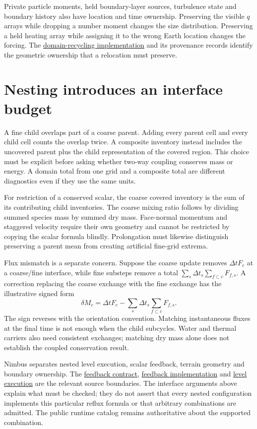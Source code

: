 Private particle moments, held boundary-layer sources, turbulence state and
boundary history also have location and time ownership. Preserving the visible
$q$ arrays while dropping a number moment changes the size distribution.
Preserving a held heating array while assigning it to the wrong Earth location
changes the forcing. The
\href{../src/core/infra/domain_recycling.cpp}{domain-recycling implementation}
and its provenance records identify the geometric ownership that a relocation
must preserve.

\section{Nesting introduces an interface budget}

A fine child overlaps part of a coarse parent. Adding every parent cell and every
child cell counts the overlap twice. A composite inventory instead includes
the uncovered parent plus the child representation of the covered region.
This choice must be explicit before asking whether two-way coupling conserves
mass or energy. A domain total from one grid and a composite total are different
diagnostics even if they use the same units.

For restriction of a conserved scalar, the coarse covered inventory is the sum
of its contributing child inventories. The coarse mixing ratio follows by
dividing summed species mass by summed dry mass. Face-normal momentum and
staggered velocity require their own geometry and cannot be restricted by
copying the scalar formula blindly. Prolongation must likewise distinguish
preserving a parent mean from creating artificial fine-grid extrema.

Flux mismatch is a separate concern. Suppose the coarse update removes
$\Delta tF_c$ at a coarse/fine interface, while fine substeps remove a total
$\sum_s\Delta t_s\sum_{f\subset c}F_{f,s}$. A correction replacing the coarse
exchange with the fine exchange has the illustrative signed form
\[
 \delta M_c=\Delta t F_c-
            \sum_s\Delta t_s\sum_{f\subset c}F_{f,s}.
\]
The sign reverses with the orientation convention. Matching instantaneous
fluxes at the final time is not enough when the child subcycles. Water and
thermal carriers also need consistent exchanges; matching dry mass alone does
not establish the coupled conservation result.

Nimbus separates nested level execution, scalar feedback, terrain geometry and
boundary ownership. The
\href{../include/core/infra/nested_scalar_feedback.hpp}{feedback contract},
\href{../src/core/infra/nested_scalar_feedback.cpp}{feedback implementation} and
\href{../src/core/infra/nested_execution.cpp}{level execution} are the relevant
source boundaries. The interface arguments above explain what must be checked;
they do not assert that every nested configuration implements this particular
reflux formula or that arbitrary combinations are admitted. The public runtime
catalog remains authoritative about the supported combination.

